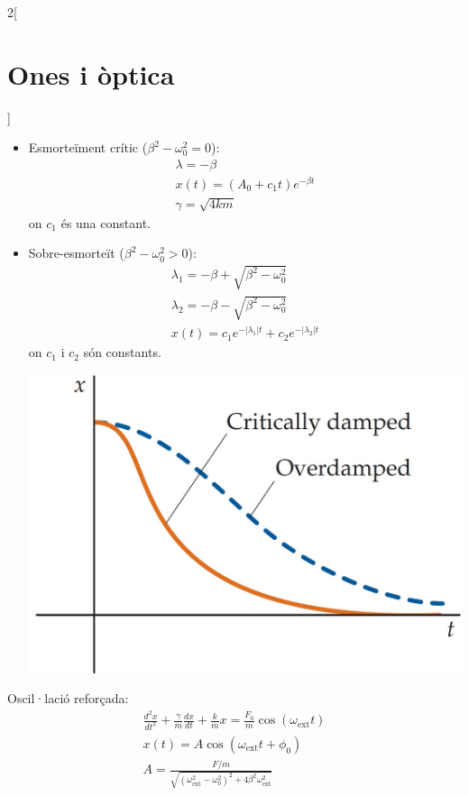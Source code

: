 \documentclass[../../../main.tex]{subfiles}
\begin{document}
\begin{multicols}{2}[\section{Ones i òptica}]
\begin{itemize}
\begin{minipage}{\linewidth}
    \end{minipage}
    \item Esmorteïment crític ($\beta^2 -\omega_0^2=0$):
    \begin{gather*}
    \lambda=-\beta\\
    x(t)=(A_0+c_1t)e^{-\beta t}\\
    \gamma=\sqrt{4km}
\end{gather*}
{\footnotesize on $c_1$ és una constant.}
    \item Sobre-esmorteït ($\beta^2-\omega_0^2>0$):
    \begin{gather*}
    \lambda_1=-\beta+\sqrt{\beta^2-\omega_0^2}\\
    \lambda_2=-\beta-\sqrt{\beta^2-\omega_0^2}\\
    x(t)=c_1e^{-|\lambda_1|t}+c_2e^{-|\lambda_2|t}
\end{gather*}
{\footnotesize on $c_1$ i $c_2$ són constants.}\newline
    \begin{minipage}{\linewidth}
       \centering
       \includegraphics[width=\linewidth]{Physics/1st/Waves_and_optics/Images/cdamp.jpg}
    \end{minipage}
\end{itemize}
Oscil·lació reforçada:
\begin{gather*}
    \frac{d^2x}{dt^2}+\frac{\gamma}{m}\frac{dx}{dt}+\frac{k}{m}x=\frac{F_0}{m}\cos(\omega_{\text{ext}}t)\\
    x(t)=A\cos(\omega_\text{ext}t+\phi_0)\\
    A=\frac{F/m}{\sqrt{(\omega_{\text{ext}}^2-\omega_0^2)^2+4\beta^2\omega_\text{ext}^2}}\\

\end{gather*}
\end{multicols}
\end{document}
